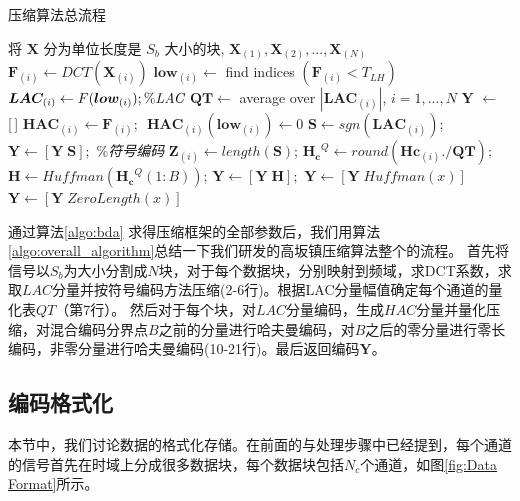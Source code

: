 \begin{algorithm}
\caption{压缩算法总流程}
\label{algo:overall_algorithm}
\begin{algorithmic}[1]  
\State 将 $\bm{X}$ 分为单位长度是 $S_b$ 大小的块, $\bm{X}_{(1)},\bm{X}_{(2)},...,\bm{X}_{(N)}$
        \State $\bm{F}_{(i)} \leftarrow DCT(\bm{X}_{(i)})$
        \State $\bm{low}_{(i)}\leftarrow$ find indices $(\bm{F}_{(i)}<T_{LH})$
        \State$\bm{LAC}_{(i)} \leftarrow F(\bm{low}_{(i)});\%\emph{LAC}$
    \EndFor
    \State $\bm{QT}\leftarrow$ average over $|\bm{LAC}_{(i)}|$,\,\,$i=1,...,N$
	\State $\bm{Y}$ $\leftarrow$ [\,]
    \State $\bm{HAC}_{(i)} \leftarrow \bm{F}_{(i)}$; \,\,$\bm{HAC}_{(i)}(\bm{low}_{(i)}) \leftarrow 0$
    \State $\bm{S}\leftarrow sgn(\bm{LAC}_{(i)})$;\,\, $\bm{Y}\leftarrow [\bm{Y}\; \bm{S}];$  \%\emph{符号编码}
    \State $\bm{Z}_{(i)}\leftarrow length(\bm{S})$; 
    \State $\bm{H_c}^Q\leftarrow round(\bm{Hc}_{(i)}./\bm{QT});$
    \State $\bm{H}\leftarrow Huffman(\bm{H_c}^Q(1:B))$; $\bm{Y} \leftarrow [\bm{Y}\; \bm{H}];$
            	\State $\bm{Y} \leftarrow [\bm{Y}\; Huffman(x)]$
	        \Else
    	        \State $\bm{Y} \leftarrow [\bm{Y}\; ZeroLength(x)]$
    	    \EndIf    	        
        \EndFor
\EndFor
\end{algorithmic}
\end{algorithm}


通过算法\ref{algo:bda} 求得压缩框架的全部参数后，我们用算法\ref{algo:overall_algorithm}总结一下我们研发的高坂镇压缩算法整个的流程。 首先将信号以$S_b$为大小分割成$N$块，对于每个数据块，分别映射到频域，求DCT系数，求取$LAC$分量并按符号编码方法压缩(2-6行)。根据LAC分量幅值确定每个通道的量化表$QT$（第7行）。 然后对于每个块，对$LAC$分量编码，生成$HAC$分量并量化压缩，对混合编码分界点$B$之前的分量进行哈夫曼编码，对$B$之后的零分量进行零长编码，非零分量进行哈夫曼编码(10-21行)。最后返回编码$\bm{Y}$。







\subsection{编码格式化}
本节中，我们讨论数据的格式化存储。在前面的与处理步骤中已经提到，每个通道的信号首先在时域上分成很多数据块，每个数据块包括$N_c$个通道，如图\ref{fig:Data Format}所示。


